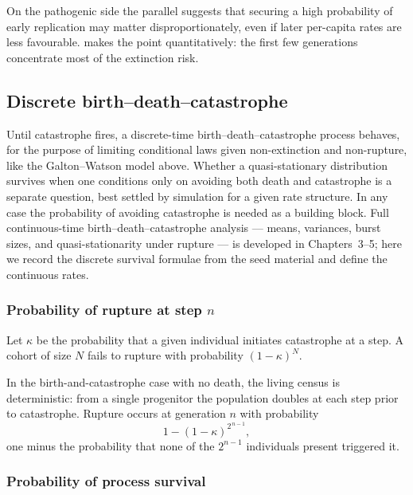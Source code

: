 On the pathogenic side the parallel suggests that securing a high probability of early replication may matter disproportionately, even if later per-capita rates are less favourable.  makes the point quantitatively: the first few generations concentrate most of the extinction risk.

\subsection{Discrete birth--death--catastrophe}
\label{sec:bdc}

Until catastrophe fires, a discrete-time birth--death--catastrophe process behaves, for the purpose of limiting conditional laws given non-extinction and non-rupture, like the Galton--Watson model above. Whether a quasi-stationary distribution survives when one conditions only on avoiding both death and catastrophe is a separate question, best settled by simulation for a given rate structure. In any case the probability of avoiding catastrophe is needed as a building block. Full continuous-time birth--death--catastrophe analysis --- means, variances, burst sizes, and quasi-stationarity under rupture --- is developed in Chapters~3--5; here we record the discrete survival formulae from the seed material and define the continuous rates.

\subsubsection*{Probability of rupture at step \texorpdfstring{$n$}{n}}

Let \(\kappa\) be the probability that a given individual initiates catastrophe at a step. A cohort of size \(N\) fails to rupture with probability \((1-\kappa)^N\).

In the birth-and-catastrophe case with no death, the living census is deterministic: from a single progenitor the population doubles at each step prior to catastrophe. Rupture occurs at generation \(n\) with probability
\begin{equation*}
1-(1-\kappa)^{2^{\,n-1}},
\end{equation*}
one minus the probability that none of the \(2^{n-1}\) individuals present triggered it.

\subsubsection*{Probability of process survival}

